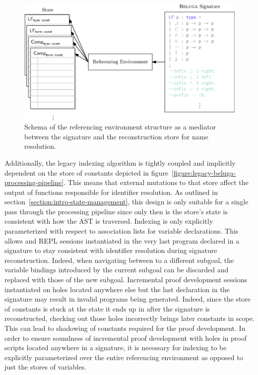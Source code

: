 \begin{figure}[htb]
\centering
\includegraphics{figures/referencing-environment-architecture.eps}
\caption[Role of the referencing environment in \Beluga]{%
Schema of the referencing environment structure as a mediator between the \Beluga signature and the reconstruction store for name resolution.
}
\label{figure:referencing-environment-architecture}
\end{figure}

Additionally, the legacy indexing algorithm is tightly coupled and implicitly dependent on the store of constants depicted in figure~\ref{figure:legacy-beluga-processing-pipeline}.
This means that external mutations to that store affect the output of functions responsible for identifier resolution.
As outlined in section~\ref{section:intro-state-management}, this design is only suitable for a single pass through the processing pipeline since only then is the store's state is consistent with how the \ac{AST} is traversed.
Indexing is only explicitly parameterized with respect to association lists for variable declarations.
This allows \Harpoon and \ac{REPL} sessions instantiated in the very last program declared in a \Beluga signature to stay consistent with identifier resolution during signature reconstruction.
Indeed, when navigating between to a different \Harpoon subgoal, the variable bindings introduced by the current subgoal can be discarded and replaced with those of the new subgoal.
Incremental proof development sessions instantiated on holes located anywhere else but the last declaration in the signature may result in invalid programs being generated.
Indeed, since the store of constants is stuck at the state it ends up in after the signature is reconstructed, checking out those holes incorrectly brings later constants in scope.
This can lead to shadowing of constants required for the proof development.
In order to ensure soundness of incremental proof development with holes in proof scripts located anywhere in a signature, it is necessary for indexing to be explicitly parameterized over the entire referencing environment as opposed to just the stores of variables.

